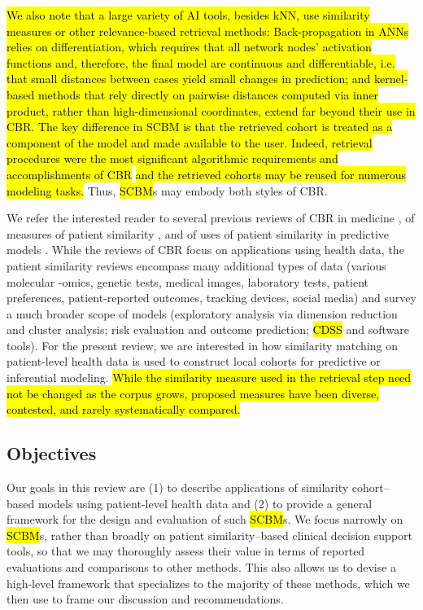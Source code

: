 \documentclass[sn-mathphys,Numbered,pdflatex]{sn-jnl}
\theoremstyle{remark}
\theoremstyle{definition}
\begin{document}
\hl{We also note that a large variety of AI tools, besides kNN, use similarity measures or other relevance-based retrieval methods: Back-propagation in ANNs relies on differentiation, which requires that all network nodes' activation functions and, therefore, the final model are continuous and differentiable, i.e. that small distances between cases yield small changes in prediction; and kernel-based methods that rely directly on pairwise distances computed via inner product, rather than high-dimensional coordinates, extend far beyond their use in CBR. The key difference in SCBM is that the retrieved cohort is treated as a component of the model and made available to the user. Indeed, retrieval procedures were the most significant algorithmic requirements and accomplishments of CBR }\citep{Kolodner1992, Gierl1998}\hl{ and the retrieved cohorts may be reused for numerous modeling tasks.}
Thus, \hl{SCBM}s may embody both styles of CBR.

We refer the interested reader to several previous reviews of CBR in
medicine \citep{Gierl1998, Begum2011, Choudhury2016}, of measures of
patient similarity \citep{Dai2020}, and of uses of patient similarity in
predictive models \citep{Welch2013, Sharafoddini2017, Parimbelli2018}.
While the reviews of CBR focus on applications using health data, the
patient similarity reviews encompass many additional types of data
(various molecular -omics, genetic tests, medical images, laboratory
tests, patient preferences, patient-reported outcomes, tracking devices,
social media) and survey a much broader scope of models (exploratory
analysis via dimension reduction and cluster analysis; risk evaluation
and outcome prediction; \hl{CDSS} and software tools). For the present
review, we are interested in how similarity matching on patient-level
health data is used to construct local cohorts for predictive or
inferential
modeling.\hl{ While the similarity measure used in the retrieval step need not be changed as the corpus grows, proposed measures have been diverse, contested, and rarely systematically compared.}

\subsection{Objectives}\label{objectives}

Our goals in this review are (1) to describe applications of similarity
cohort--based models using patient-level health data and (2) to provide
a general framework for the design and evaluation of such \hl{SCBM}s. We
focus narrowly on \hl{SCBM}s, rather than broadly on patient
similarity--based clinical decision support tools, so that we may
thoroughly assess their value in terms of reported evaluations and
comparisons to other methods. This also allows us to devise a high-level
framework that specializes to the majority of these methods, which we
then use to frame our discussion and recommendations.
\end{document}
